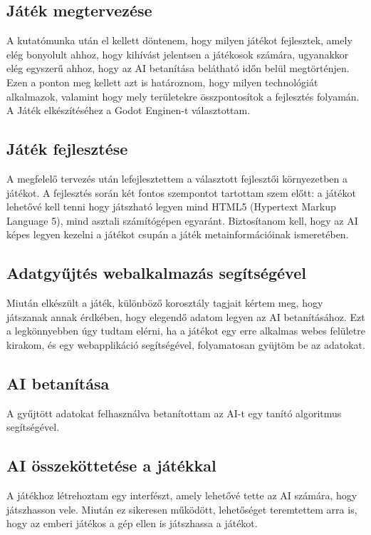 \subsection{Játék megtervezése}
A kutatómunka után el kellett döntenem, hogy milyen játékot fejlesztek, amely elég bonyolult ahhoz, hogy kihívást jelentsen a játékosok számára, ugyanakkor elég egyszerű ahhoz, hogy az AI betanítása belátható időn belül megtörténjen. Ezen a ponton meg kellett azt is határoznom, hogy milyen technológiát alkalmazok, valamint hogy mely területekre összpontosítok a fejlesztés folyamán. A Játék elkészítéséhez a Godot Enginen-t választottam.

\subsection{Játék fejlesztése}
A megfelelő tervezés után lefejlesztettem a választott fejlesztői környezetben a játékot. A fejlesztés során két fontos szempontot tartottam szem előtt: a játékot lehetővé kell tenni hogy játszható legyen mind HTML5 (Hypertext Markup Language 5), mind asztali számítógépen egyaránt. Biztosítanom kell, hogy az AI képes legyen kezelni a játékot csupán a játék metainformációinak ismeretében.

\subsection{Adatgyűjtés webalkalmazás segítségével}
Miután elkészült a játék, különböző korosztály tagjait kértem meg, hogy játszanak annak érdkében, hogy elegendő adatom legyen az AI betanításához. Ezt a legkönnyebben úgy tudtam elérni, ha a játékot egy erre alkalmas webes felületre kirakom, és egy webapplikáció segítségével, folyamatosan gyüjtöm be az adatokat. 

\subsection{AI betanítása}
A gyűjtött adatokat felhasználva betanítottam az AI-t egy tanító algoritmus segítségével.

\subsection{AI összeköttetése a játékkal}
A játékhoz létrehoztam egy interfészt, amely lehetővé tette az AI számára, hogy játszhasson vele. Miután ez sikeresen működött, lehetőséget teremtettem arra is, hogy az emberi játékos a gép ellen is játszhassa a játékot.